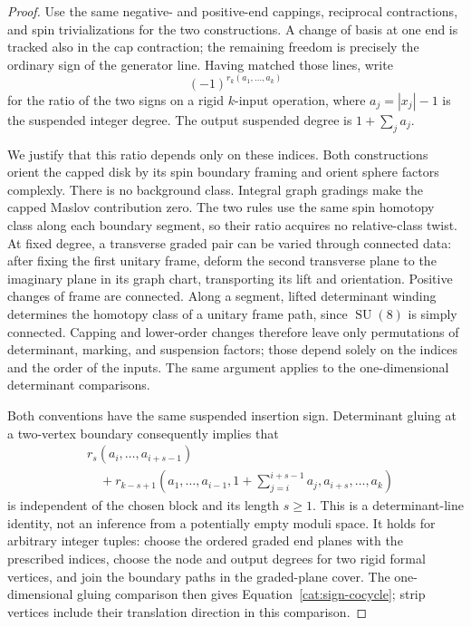 \documentclass[11pt]{article}
\theoremstyle{definition}
\theoremstyle{remark}
\DeclareMathOperator{\SU}{SU}
\numberwithin{equation}{section}
\begin{document}
\begin{proof}
Use the same negative- and positive-end cappings, reciprocal
contractions, and spin trivializations for the two constructions.
A change of basis at one end is tracked also in the cap contraction;
the remaining freedom is precisely the ordinary sign of the generator
line.  Having matched those lines, write
\[
 (-1)^{r_k(a_1,\ldots,a_k)}
\]
for the ratio of the two signs on a rigid \(k\)-input operation, where
\(a_j=|x_j|-1\) is the suspended integer degree.
The output suspended degree is \(1+\sum_j a_j\).

We justify that this ratio depends only on these indices.
Both constructions orient the capped disk by its spin boundary
framing and orient sphere factors complexly.  There is no background
class.  Integral graph gradings make the capped Maslov contribution
zero.  The two rules use the same spin homotopy class along each
boundary segment, so their ratio acquires no relative-class twist.
At fixed degree, a transverse graded pair can be varied through
connected data: after fixing the first unitary frame, deform the
second transverse plane to the imaginary plane in its graph chart,
transporting its lift and orientation.  Positive changes of frame
are connected.  Along a segment, lifted determinant winding determines
the homotopy class of a unitary frame path, since \(\SU(8)\) is simply
connected.  Capping and lower-order changes therefore leave only
permutations of determinant, marking, and suspension factors; those
depend solely on the indices and the order of the inputs.
The same argument applies to the one-dimensional determinant
comparisons.

Both conventions have the same suspended insertion sign.
Determinant gluing at a two-vertex boundary consequently implies that
\begin{equation}\label{cat:sign-cocycle}
 \begin{split}
 &r_s(a_i,\ldots,a_{i+s-1})\\
 &\quad+
 r_{k-s+1}\left(a_1,\ldots,a_{i-1},
         1+\sum_{j=i}^{i+s-1}a_j,
         a_{i+s},\ldots,a_k\right)
 \end{split}
\end{equation}
is independent of the chosen block and its length \(s\ge1\).
This is a determinant-line identity, not an inference from a
potentially empty moduli space.  It holds for arbitrary integer
tuples: choose the ordered graded end planes with the prescribed
indices, choose the node and output degrees for two rigid formal
vertices, and join the boundary paths in the graded-plane cover.
The one-dimensional gluing comparison then gives
Equation~\eqref{cat:sign-cocycle}; strip vertices include their
translation direction in this comparison.


\end{proof}
\end{document}
